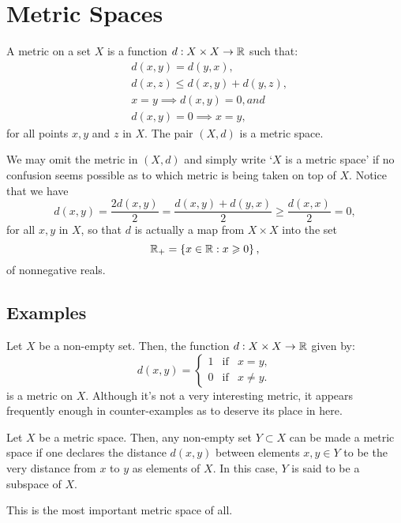 \section{Metric Spaces}\label{sec:metric-spaces}

\begin{definition}
  A metric on a set \(X\) is a function \(d:X\times{X}\to\mathbb{R}\) such that:
  \begin{align}
      & d(x,y)=d(y,x),                  \label{axiom:metric-space-01} \\
      & d(x,z)\leqslant{d(x,y)+d(y,z)}, \label{axiom:metric-space-02} \\
      & x=y\implies{d(x,y)=0}, and      \label{axiom:metric-space-03} \\
      & d(x,y)=0\implies{x=y},          \label{axiom:metric-space-04}
  \end{align}
  for all points \(x,y\) and \(z\) in \(X\). The pair \((X,d)\) is a metric
  space.
\end{definition}

We may omit the metric in \((X,d)\) and simply write `\(X\) is a metric space'
if no confusion seems possible as to which metric is being taken on top of
\(X\). Notice that we have
\[
  d(x,y)
  =
  \frac{2d(x,y)}{2}
  =
  \frac{d(x,y)+d(y,x)}{2}
  \geqslant
  \frac{d(x,x)}{2}
  =
  0,
\]
for all \(x,y\) in \(X\), so that \(d\) is actually a map from \(X\times{X}\)
into the set
\[
  \mathbb{R}_{+}
  =
  \left\{x\in\mathbb{R}:x\geqslant{0}\right\},
\]
of nonnegative reals.

\subsection{Examples}

\begin{example}\label{example:the-0-1-metric}
  Let \(X\) be a non-empty set. Then, the function \(d:X\times{X}\to\mathbb{R}\)
  given by:
  \begin{equation*}
    d(x,y)=
    \left\{
      \begin{array}{lll}
        1 & \text{if} & x=y, \\
        0 & \text{if} & x\neq{y}.
      \end{array}
    \right.
  \end{equation*}
  is a metric on \(X\). Although it's not a very interesting metric, it appears
  frequently enough in counter-examples as to deserve its place in here.
\end{example}

\begin{example}\label{example:subspaces}
  Let \(X\) be a metric space. Then, any non-empty set \(Y\subset{X}\) can be
  made a metric space if one declares the distance \(d(x,y)\) between elements
  \(x,y\in{Y}\) to be the very distance from \(x\) to \(y\) as elements of
  \(X\). In this case, \(Y\) is said to be a subspace of \(X\).
\end{example}

\begin{example}\label{example:the-real-line}
  This is the most important metric space of all.
\end{example}


